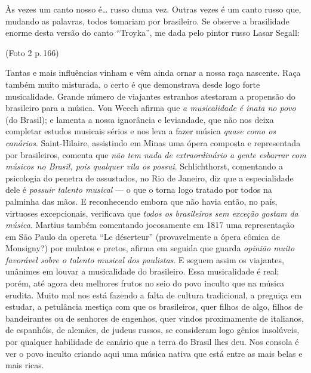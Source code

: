 Às vezes um canto nosso é\ldots{} russo duma vez. Outras vezes é um canto
russo que, mudando as palavras, todos tomariam por brasileiro. Se
observe a brasilidade enorme desta versão do canto ``Troyka'', me dada
pelo pintor russo Lasar Segall:

(Foto 2 p.\,166)

Tantas e mais influências vinham e vêm ainda ornar a nossa raça
nascente. Raça também muito misturada, o certo é que demonstrava desde
logo forte musicalidade. Grande número de viajantes estranhos atestaram
a propensão do brasileiro para a música. Von Weech afirma que \textit{a
musicalidade é inata no povo} (do Brasil); e lamenta a nossa ignorância
e leviandade, que não nos deixa completar estudos musicais sérios e nos
leva a fazer música \textit{quase como os canários}. Saint-Hilaire,
assistindo em Minas uma ópera composta e representada por brasileiros,
comenta que \textit{não tem nada de extraordinário a gente esbarrar com
músicos no Brasil, pois qualquer vila os possui}. Schlichthorst,
comentando a psicologia do penetra de assustados, no Rio de Janeiro, diz
que a especialidade dele é \textit{possuir talento musical} --- o que o torna
logo tratado por todos na palminha das mãos. E reconhecendo embora que
não havia então, no país, virtuoses excepcionais, verificava que \textit{todos
os brasileiros sem exceção gostam da música}. Martius também comentando
jocosamente em 1817 uma representação em São Paulo da opereta ``Le
déserteur'' (provavelmente a ópera cômica de Monsigny?) por mulatos e
pretos, afirma em seguida que guarda \textit{opinião muito favorável sobre o
talento musical dos paulistas}. E seguem assim os viajantes, unânimes
em louvar a musicalidade do brasileiro. Essa musicalidade é real; porém,
até agora deu melhores frutos no seio do povo inculto que na música
erudita. Muito mal nos está fazendo a falta de cultura tradicional, a
preguiça em estudar, a petulância mestiça com que os brasileiros, quer
filhos de algo, filhos de bandeirantes ou de senhores de engenhos, quer
vindos proximamente de italianos, de espanhóis, de alemães, de judeus
russos, se consideram logo gênios insolúveis, por qualquer habilidade de
canário que a terra do Brasil lhes deu. Nos consola é ver o povo inculto
criando aqui uma música nativa que está entre as mais belas e mais
ricas.

